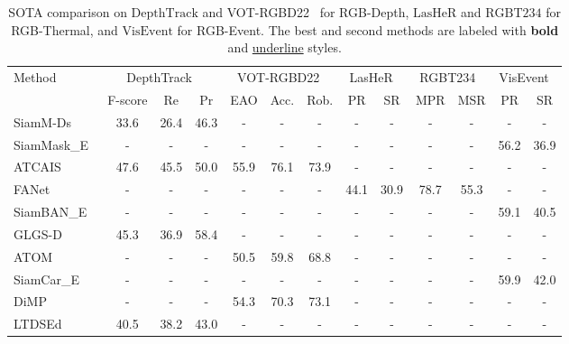 \begin{table}[t]
\caption{SOTA comparison on $\mathrm{DepthTrack}$ \cite{depthtrack} and VOT-RGBD22~\cite{vot2022} for RGB-Depth, $\mathrm{LasHeR}$\cite{li2021lasher} and $\mathrm{RGBT234}$\cite{rgbt234} for RGB-Thermal, and $\mathrm{VisEvent}$\cite{wang2023visevent} for RGB-Event. The best and second methods are labeled with \textbf{bold} and \underline{underline} styles.}
\label{tab-sota-miss}
\centering
\setlength{\tabcolsep}{3mm} %
\small %
\begin{tabular}{l|ccc|ccc|cc|cc|cc}
\toprule
\multirow{2}{*}{Method} 
& \multicolumn{3}{c|}{DepthTrack~\cite{depthtrack}} 
& \multicolumn{3}{c|}{VOT-RGBD22~\cite{vot2022}}
& \multicolumn{2}{c|}{LasHeR~\cite{li2021lasher}} 
& \multicolumn{2}{c|}{RGBT234~\cite{rgbt234}} 
& \multicolumn{2}{c}{VisEvent~\cite{wang2023visevent}} \\
\cmidrule(lr){2-4} \cmidrule(lr){5-7} \cmidrule(lr){8-9} \cmidrule(lr){10-11} \cmidrule(lr){12-13}
& F-score & Re & Pr 
& EAO & Acc.& Rob.
& PR & SR 
& MPR & MSR 
& PR & SR \\
\midrule
SiamM-Ds~\cite{VOT2019}
& 33.6 & 26.4 & 46.3 &  -   &  -   &  -   &  -   &  -   &  -   &  -   &  -   &  -   \\
SiamMask\_E~\cite{SiamMask}
&  -   &  -   &  -   &  -   &  -   &  -   &  -   &  -   &  -   &  -   & 56.2 & 36.9 \\
ATCAIS~\cite{vot2020}
& 47.6 & 45.5 & 50.0 & 55.9 & 76.1 & 73.9 &  -   &  -   &  -   &  -   &  -   &  -   \\
FANet~\cite{fanet}
&  -   &  -   &  -   &  -   &  -   &  -   & 44.1 & 30.9 & 78.7 & 55.3 &  -   &  -   \\
SiamBAN\_E~\cite{siamban}
&  -   &  -   &  -   &  -   &  -   &  -   &  -   &  -   &  -   &  -   & 59.1 & 40.5\\
GLGS-D~\cite{vot2020}
& 45.3 & 36.9 & 58.4 &  -   &  -   &  -   &  -   &  -   &  -   &  -   &  -   &  -   \\
ATOM~\cite{atom}
&  -   &  -   &  -   & 50.5 & 59.8 & 68.8 &  -   &  -   &  -   &  -   &  -   &  -   \\

SiamCar\_E~\cite{Stark}
&  -   &  -   &  -   &  -   &  -   &  -   &  -   &  -   &  -   &  -   & 59.9 & 42.0\\
DiMP~\cite{dimp}
&  -   &  -   &  -   & 54.3 & 70.3 & 73.1 &  -   &  -   &  -   &  -   &  -   &  -   \\
LTDSEd~\cite{VOT2019}
& 40.5 & 38.2 & 43.0 &  -   &  -   &  -   &  -   &  -   &  -   &  -   &  -   &  -   \\


\end{tabular}
\end{table}
